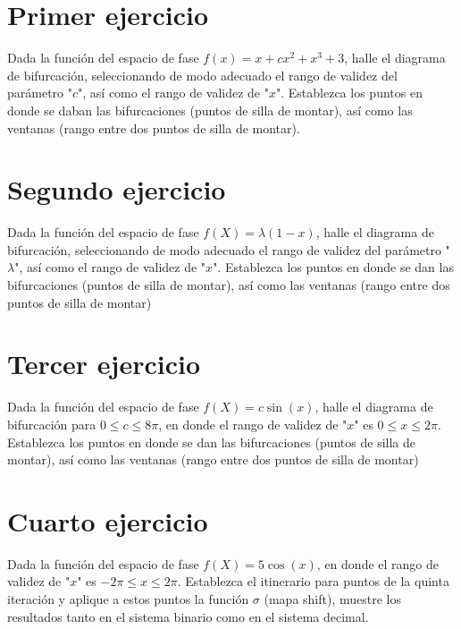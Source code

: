 \documentclass[11pt]{report}
\theoremstyle{plain}
\theoremstyle{definition}
\begin{document}

\tableofcontents

\part{Primer ejercicio}
Dada la función del espacio de fase $f(x) = x+cx^2+x^3+3$, halle el diagrama de bifurcación, seleccionando de modo adecuado el rango de validez del parámetro "$c$", así como el rango de validez de "$x$". Establezca los puntos en donde se daban las bifurcaciones (puntos de silla de montar), así como las ventanas (rango entre dos puntos de silla de montar).
\part{Segundo ejercicio}
Dada la función del espacio de fase $f(X) = \lambda (1-x)$, halle el diagrama de bifurcación, seleccionando de modo adecuado el rango de validez del parámetro "$\lambda$", así como el rango de validez de "$x$". Establezca los puntos en donde se dan las bifurcaciones (puntos de silla de montar), así como las ventanas (rango entre dos puntos de silla de montar)
\part{Tercer ejercicio}
Dada la función del espacio de fase $f(X) = c\sin(x)$, halle el diagrama de bifurcación para $0\leq c \leq 8\pi$, en donde el rango de validez de "$x$" es $0\leq x \leq 2\pi$. Establezca los puntos en donde se dan las bifurcaciones (puntos de silla de montar), así como las ventanas (rango entre dos puntos de silla de montar)
\part{Cuarto ejercicio}
Dada la función del espacio de fase $f(X) = 5\cos(x)$, en donde el rango de validez de "$x$" es $-2\pi\leq x \leq 2\pi$. Establezca el itinerario para puntos de la quinta iteración y aplique a estos puntos la función $\sigma$ (mapa shift), muestre los resultados tanto en el sistema binario como en el sistema decimal.
\end{document}
